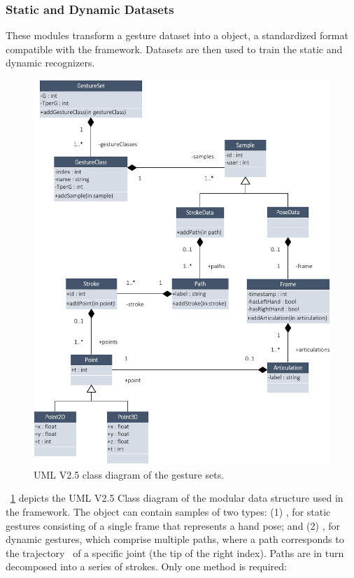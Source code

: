 \subsubsection{Static and Dynamic Datasets}
These modules transform a gesture dataset into a  object, \ie a standardized format compatible with the framework. Datasets are then used to train the static and dynamic recognizers.
\begin{figure}[p]
    \centering
    \captionsetup{justification=centering}
    \includegraphics[width=\linewidth]{Figures/QuantumLeap/Architecture/QuantumLeap-UML.pdf}
    \caption{UML V2.5 class diagram of the gesture sets.}
    \label{fig:quantumleap:dataset-uml}
\end{figure}
\fig~\ref{fig:quantumleap:dataset-uml} depicts the UML V2.5 \cite{Bush:2011} Class diagram of the modular data structure used in the framework. The  object can contain samples of two types: (1) , for static gestures consisting of a single frame that represents a hand pose; and (2) , for dynamic gestures, which comprise multiple paths, where a path corresponds to the trajectory~\cite{Caputo:2018} of a specific joint (\eg the tip of the right index). Paths are in turn decomposed into a series of strokes. Only one method is required:
